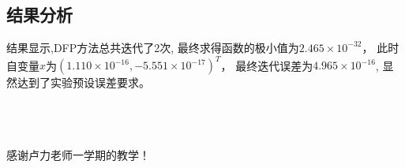 \documentclass[12pt,a4paper]{article}
\begin{document}
~\\~\\~\\~\\~\\~\\~\\~\\
\subsection{结果分析}

结果显示,DFP方法总共迭代了2次,
最终求得函数的极小值为$2.465\times 10^{-32}$，
此时自变量$x$为$(1.110\times 10^{-16}, -5.551\times 10^{-17})^T$，
最终迭代误差为$4.965\times 10^{-16}$,
显然达到了实验预设误差要求。

~\\~\\~\\
感谢卢力老师一学期的教学！
\end{document}
